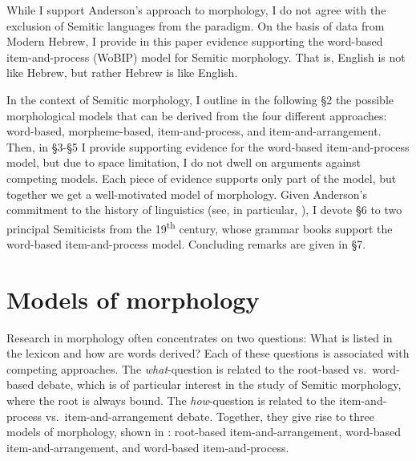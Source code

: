 \documentclass[output=paper,
modfonts
]{LSP/langsci}
\begin{document}
While I support Anderson's approach to morphology, I do not agree with
the exclusion of Semitic languages from the paradigm. On the basis of
data from Modern Hebrew, I provide in this paper evidence supporting the
word-based item-and-process (WoBIP) model for Semitic morphology. That
is, English is not like Hebrew, but rather Hebrew is like English.

In the context of Semitic morphology, I outline in the following §2 the
possible morphological models that can be derived from the four
different approaches: word-based, morpheme-based, item-and-process, and
item-and-arrangement. Then, in §3-§5 I provide supporting evidence for
the word-based item-and-process model, but due to space limitation, I do
not dwell on arguments against competing models. Each piece of evidence
supports only part of the model, but together we get a well-motivated
model of morphology. Given Anderson's commitment to the history of
linguistics (see, in particular, \citealt{anderson1985a}), I devote §6 to two
principal Semiticists from the 19\textsuperscript{th} century, whose
grammar books support the word-based item-and-process model. Concluding
remarks are given in §7.

\section{Models of morphology}\label{models-of-morphology}

Research in morphology often concentrates on two questions: What is
listed in the lexicon and how are words derived? Each of these questions
is associated with competing approaches. The \emph{what}-question is
related to the root-based vs.\ word-based debate, which is of particular
interest in the study of Semitic morphology, where the root is always
bound. The \emph{how}-question is related to the item-and-process vs.\ item-and-arrangement debate. Together, they give rise to three models of
morphology, shown in : root-based item-and-arrangement, word-based
item-and-arrangement, and word-based item-and-process.
\end{document}
